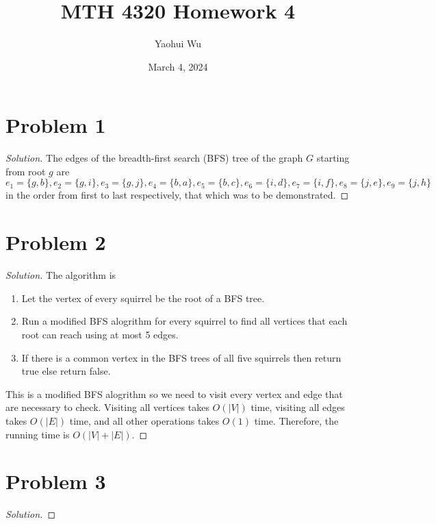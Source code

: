 \documentclass[12pt]{article}
\title{MTH 4320 Homework 4}
\author{Yaohui Wu}
\date{March 4, 2024}
\newenvironment*{solution}{\begin{proof}[Solution]}{\end{proof}}
\begin{document}
\maketitle
\section*{Problem 1}
\begin{solution}
    The edges of the breadth-first search (BFS) tree of the graph \(G\)
    starting from root \(g\) are \(e_1=\{g,b\},e_2=\{g,i\},e_3=\{g,j\},e_4=\{
        b,a\},e_5=\{b,c\},e_6=\{i,d\},e_7=\{i,f\},e_8=\{j,e\},e_9=\{j,h\}\) in
        the order from first to last respectively, that which was to be
        demonstrated.
\end{solution}
\section*{Problem 2}
\begin{solution}
    The algorithm is
    \begin{enumerate}
        \item Let the vertex of every squirrel be the root of a BFS tree.
        \item Run a modified BFS alogrithm for every squirrel to find all vertices
        that each root can reach using at most 5 edges.
        \item If there is a common vertex in the BFS trees of all five
        squirrels then return true else return false.
    \end{enumerate}
    This is a modified BFS alogrithm so we need to visit every vertex and edge
    that are necessary to check. Visiting all vertices takes \(O(|V|)\) time,
    visiting all edges takes \(O(|E|)\) time, and all other operations takes
    \(O(1)\) time. Therefore, the running time is \(O(|V|+|E|)\).
\end{solution}
\section*{Problem 3}
\begin{solution}

\end{solution}
\end{document}
